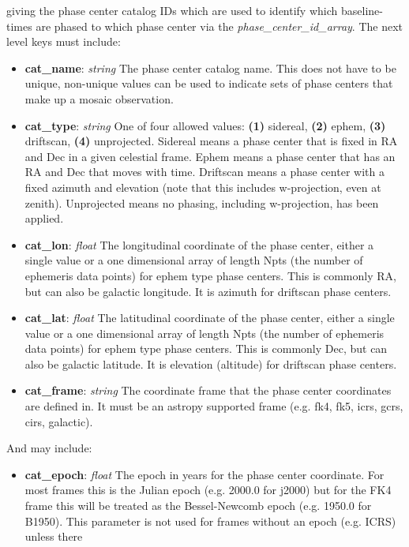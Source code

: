 \documentclass[11pt, oneside]{article}
\begin{document}
\begin{itemize}
giving the phase center catalog IDs which are used to identify which
baseline-times are phased to which phase center via the \textit{phase\_center\_id\_array}.
The next level keys must include:
	\begin{itemize}
	\item \textbf{cat\_name}: \textit{string} The phase center catalog name. This
	  does not have to be unique, non-unique values can be used to indicate sets
	  of phase centers that make up a mosaic observation.
	\item \textbf{cat\_type}: \textit{string} One of four allowed values:
	  \textbf{(1)} sidereal, \textbf{(2)} ephem, \textbf{(3)} driftscan,
	  \textbf{(4)} unprojected.
  	  Sidereal means a phase center that is fixed in RA and Dec in a given
	  celestial frame.
	  Ephem means a phase center that has an RA and Dec that
	  moves with time.
	  Driftscan means a phase center with a fixed azimuth and
	  elevation (note that this includes w-projection, even at zenith).
	  Unprojected means no phasing, including w-projection, has been applied.
  	\item \textbf{cat\_lon}: \textit{float}
	  The longitudinal coordinate of the phase center, either a single value or a
	  one dimensional array of length Npts (the number of ephemeris data points)
	  for ephem type phase centers.
	  This is commonly RA, but can also be galactic longitude. It is azimuth for
	  driftscan phase centers.
  	\item \textbf{cat\_lat}: \textit{float}
	  The latitudinal coordinate of the phase center, either a single value or a
	  one dimensional array of length Npts (the number of ephemeris data points)
	  for ephem type phase centers.
	  This is commonly Dec, but can also be galactic latitude. It is elevation (altitude)
	  for driftscan phase centers.
	\item \textbf{cat\_frame}: \textit{string} The coordinate frame that the
	  phase center coordinates are defined in. It must be an astropy
	  supported frame (e.g. fk4, fk5, icrs, gcrs, cirs, galactic).
	\end{itemize}
And may include:
	\begin{itemize}
	\item \textbf{cat\_epoch}: \textit{float} The epoch in years for the phase
	  center coordinate. For most frames this is the Julian epoch
	  (e.g. 2000.0 for j2000) but for the FK4 frame this will be treated as the
	  Bessel-Newcomb epoch (e.g. 1950.0 for B1950). This parameter is
	  not used for frames without an epoch (e.g. ICRS) unless there

\end{itemize}
\end{itemize}
\end{document}
